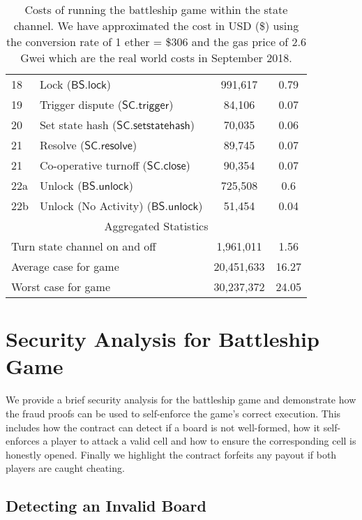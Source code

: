 \documentclass{llncs}
\newcommand{\statechanneldispute}{\mathsf{SC}.\mathsf{trigger}}
\newcommand{\statechannelsetstate}{\mathsf{SC}.\mathsf{setstatehash}}
\newcommand{\statechannelresolve}{\mathsf{SC}.\mathsf{resolve}}
\newcommand{\statechannelclose}{\mathsf{SC}.\mathsf{close}}
\newcommand{\battleshiplock}{\mathsf{BS.lock}}
\newcommand{\battleshipunlock}{\mathsf{BS.unlock}}
\begin{document}
\begin{table}
\begin{tabular}[]{l l c c}
			18 & Lock ($\battleshiplock$) & 991,617 & 0.79 \\
			19 & Trigger dispute ($\statechanneldispute$) & 84,106 & 0.07\\
			20 & Set state hash ($\statechannelsetstate$) & 70,035 & 0.06 \\
			21 & Resolve ($\statechannelresolve$) &89,745 & 0.07 \\
			21 & Co-operative turnoff ($\statechannelclose$) & 90,354 & 0.07 \\
			22a & Unlock ($\battleshipunlock$) & 725,508 & 0.6 \\
			22b & Unlock (No Activity) ($\battleshipunlock$) & 51,454 & 0.04 \\
			\hline
			\multicolumn{4}{c}{Aggregated Statistics} \\
			\hline
			\multicolumn{2}{l}{Turn state channel on and off} & 1,961,011  & 1.56 \\
			\multicolumn{2}{l}{Average case for game} & 20,451,633 & 16.27 \\
			\multicolumn{2}{l}{Worst case for game} & 30,237,372 & 24.05 \\
			\hline 
		\end{tabular}
		
		\caption{Costs of running the battleship game within the state channel. We have approximated the cost in USD (\$) using the conversion rate of 1 ether = \$306 and the gas price of 2.6 Gwei which are the real world costs in September 2018. }\label{tab:costs}
	\end{table}
	
	
	
	\section{Security Analysis for Battleship Game} \label{sec:secanalysis}
	
	We provide a brief security analysis for the battleship game and demonstrate how the fraud proofs can be used to self-enforce the game's correct execution.
	This includes how the contract can detect if a board is not well-formed, how it self-enforces a player to attack a valid cell and how to ensure the corresponding cell is honestly opened. 
	Finally we highlight the contract forfeits any payout if both players are caught cheating. 
	
	\subsection{Detecting an Invalid Board}
	
\end{document}
